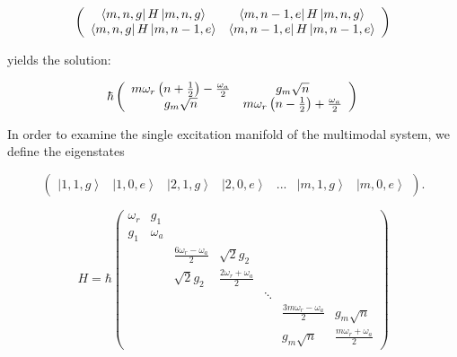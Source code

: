 \documentclass[11 pt, oneside]{book} %
\newcommand{\ket}[1]{\left| #1 \right>} %
\newcommand{\matrixel}[3]{\left< #1 \vphantom{#2#3} \right|
 #2 \left| #3 \vphantom{#1#2} \right>} %
\begin{document}
\begin{eqnarray}
\nonumber
\left(\begin{array}{cc}
\matrixel{m,n,g}{H}{m,n,g} & \matrixel{m,n-1,e}{H}{m,n,g} \\
\matrixel{m,n,g}{H}{m,n-1,e} & \matrixel{m,n-1,e}{H}{m,n-1,e}
\end{array}\right) 
\end{eqnarray}

yields the solution:

\begin{equation}
\hbar \left(\begin{array}{cc}
m\omega_r\left(n+\frac{1}{2}\right)-\frac{\omega_a}{2}	& g_m\sqrt{n} \\
 g_m\sqrt{n}					& m\omega_r\left(n-\frac{1}{2}\right)+\frac{\omega_a}{2}
\end{array}\right)\\ 
\end{equation}

In order to examine the single excitation manifold of the multimodal system, we define the eigenstates

\begin{equation}
\left(\begin{array}{ccccccc} \ket{1,1,g} & \ket{1,0,e} & \ket{2,1,g} & \ket{2,0,e} & ... & \ket{m,1, g} & \ket{m,0,e}
\end{array}\right).
\end{equation}


\begin{equation}\label{eq:MultimodalMatrix}
H =  \hbar\left(\begin{array}{cccccccc}
\omega_r 	& g_1 \\
 g_1   		& \omega_a \\
&&\frac{6\omega_r-\omega_a}{2} & \sqrt{2}g_2 \\
&&\sqrt{2}g_2		& \frac{2\omega_r+\omega_a}{2}\\
&&&&\ddots\\
&&&&&\frac{3m\omega_r-\omega_a}{2}	& g_m\sqrt{n} \\
&&&&& g_m\sqrt{n}					& \frac{m\omega_r+\omega_a}{2}
\end{array} \right)
\end{equation}


%
%
%
\end{document}

